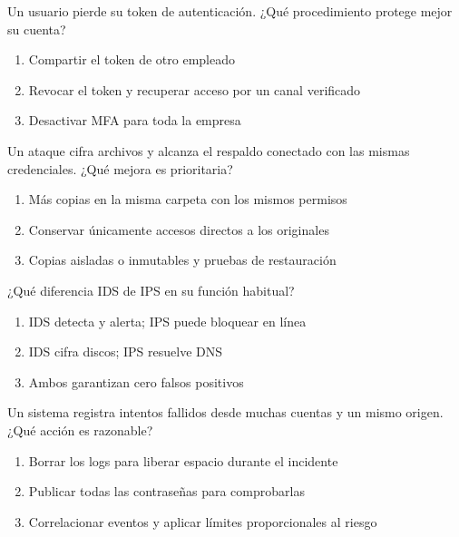 \noindent\begin{minipage}{\linewidth}\setlength{\parskip}{4pt}\label{q:R-080}
Un usuario pierde su token de autenticación. ¿Qué procedimiento protege mejor su cuenta?
\begin{enumerate}[label=\Alph*),nosep]
\item Compartir el token de otro empleado
\item Revocar el token y recuperar acceso por un canal verificado
\item Desactivar MFA para toda la empresa
\end{enumerate}\end{minipage}\par\medskip

\noindent\begin{minipage}{\linewidth}\setlength{\parskip}{4pt}\label{q:R-081}
Un ataque cifra archivos y alcanza el respaldo conectado con las mismas credenciales. ¿Qué mejora es prioritaria?
\begin{enumerate}[label=\Alph*),nosep]
\item Más copias en la misma carpeta con los mismos permisos
\item Conservar únicamente accesos directos a los originales
\item Copias aisladas o inmutables y pruebas de restauración
\end{enumerate}\end{minipage}\par\medskip

\noindent\begin{minipage}{\linewidth}\setlength{\parskip}{4pt}\label{q:R-082}
¿Qué diferencia IDS de IPS en su función habitual?
\begin{enumerate}[label=\Alph*),nosep]
\item IDS detecta y alerta; IPS puede bloquear en línea
\item IDS cifra discos; IPS resuelve DNS
\item Ambos garantizan cero falsos positivos
\end{enumerate}\end{minipage}\par\medskip

\noindent\begin{minipage}{\linewidth}\setlength{\parskip}{4pt}\label{q:R-083}
Un sistema registra intentos fallidos desde muchas cuentas y un mismo origen. ¿Qué acción es razonable?
\begin{enumerate}[label=\Alph*),nosep]
\item Borrar los logs para liberar espacio durante el incidente
\item Publicar todas las contraseñas para comprobarlas
\item Correlacionar eventos y aplicar límites proporcionales al riesgo
\end{enumerate}\end{minipage}\par\medskip

